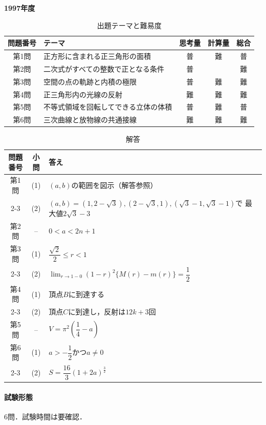 \documentclass[../../main.tex]{subfiles}
\begin{document}
\begin{center}
  {\fontsize{48pt}{58pt}\selectfont \textbf{1997}\normalsize\textbf{年度}}
\end{center}

\begin{table}[htb]
  \centering
  \caption{出題テーマと難易度}
  \begin{tabular}{|c|p{6.2cm}|c|c|c|}
    \hline
    \textbf{問題番号} & \textbf{テーマ} & \textbf{思考量} & \textbf{計算量} & \textbf{総合} \\
    \hline
    第1問 & 正方形に含まれる正三角形の面積 & 普 & 難 & 普 \\
    \hline
    第2問 & 二次式がすべての整数で正となる条件 & 普 &  & 難 \\
    \hline
    第3問 & 空間の点の軌跡と内積の極限 & 普 & 難 & 難 \\
    \hline
    第4問 & 正三角形内の光線の反射 & 難 & 難 & 難 \\
    \hline
    第5問 & 不等式領域を回転してできる立体の体積 & 普 & 難 & 普 \\
    \hline
    第6問 & 三次曲線と放物線の共通接線 & 難 & 難 & 難 \\
    \hline
  \end{tabular}
\end{table}

\begin{table}[htb]
  \centering
  \caption{解答}
  \renewcommand{\arraystretch}{1.4}
  \begin{tabular}{|c|c|p{9cm}|}
    \hline
    \textbf{問題番号} & \textbf{小問} & \textbf{答え} \\
    \hline
    第1問 & (1) & $(a,b)$の範囲を図示（解答参照） \\
    \cline{2-3}
    & (2) & $(a,b)=(1,2-\sqrt{3}),
    (2-\sqrt{3},1),(\sqrt{3}-1,\sqrt{3}-1)$で
    最大値$2\sqrt{3}-3$ \\
    \hline
    第2問 & -- & $0<a<2n+1$ \\
    \hline
    第3問 & (1) & $\dfrac{\sqrt{2}}{2}\le r<1$ \\
    \cline{2-3}
    & (2) & $\displaystyle\lim_{r\to1-0}(1-r)^2
    \{M(r)-m(r)\}=\dfrac{1}{2}$ \\
    \hline
    第4問 & (1) & 頂点$B$に到達する \\
    \cline{2-3}
    & (2) & 頂点$C$に到達し，反射は$12k+3$回 \\
    \hline
    第5問 & -- & $V=\pi^2\left(\dfrac{1}{4}-a\right)$ \\
    \hline
    第6問 & (1) & $a>-\dfrac{1}{2}$かつ$a\ne0$ \\
    \cline{2-3}
    & (2) & $S=\dfrac{16}{3}(1+2a)^{\frac{3}{2}}$ \\
    \hline
  \end{tabular}
\end{table}

\paragraph{試験形態}
6問．試験時間は要確認．
\end{document}
